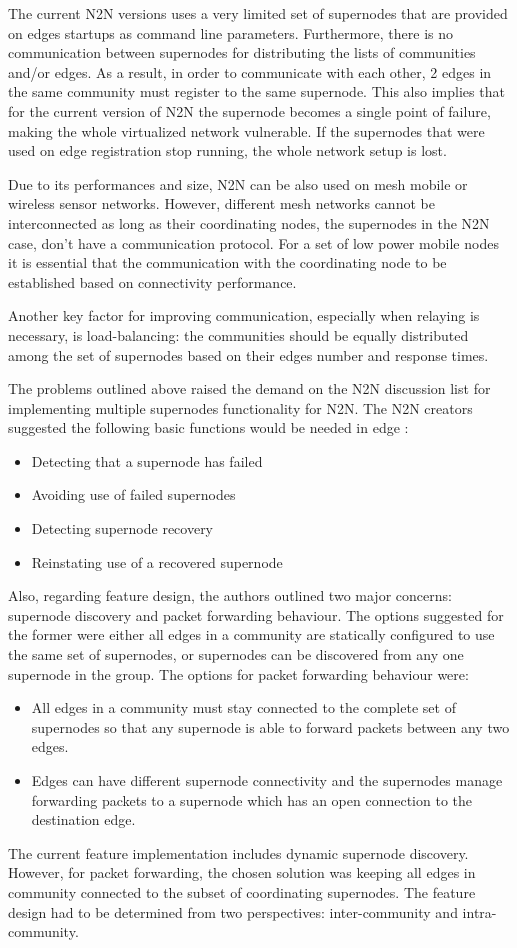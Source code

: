 
The current N2N versions uses a very limited set of supernodes that are provided on edges startups as command line parameters. Furthermore, there is no communication between supernodes for distributing the lists of communities and/or edges. As a result, in order to communicate with each other, 2 edges in the same community must register to the same supernode. This also implies that for the current version of N2N the supernode becomes a single point of failure, making the whole virtualized network vulnerable. If the supernodes that were used on edge registration stop running, the whole network setup is lost.

Due to its performances and size, N2N can be also used on mesh mobile or wireless sensor networks. However, different mesh networks cannot be interconnected as long as their coordinating nodes, the supernodes in the N2N case, don't have a communication protocol. For a set of low power mobile nodes it is essential that the communication with the coordinating node to be established based on connectivity performance.

Another key factor for improving communication, especially when relaying is necessary, is load-balancing: the communities should be equally distributed among the set of supernodes based on their edges number and response times.

The problems outlined above raised the demand on the N2N discussion list \cite{demand} for implementing multiple supernodes functionality for N2N. The N2N creators suggested the following basic functions would be needed in edge \cite{suggestions}:
\begin{itemize}
\item Detecting that a supernode has failed
\item Avoiding use of failed supernodes
\item Detecting supernode recovery
\item Reinstating use of a recovered supernode
\end{itemize}
Also, regarding feature design, the authors outlined two major concerns: supernode discovery and packet forwarding behaviour. The options suggested for the former were either all edges in a community are statically configured to use the same set of supernodes, or supernodes can be discovered from any one supernode in the group. The options for packet forwarding behaviour were:
\begin{itemize}
\item All edges in a community must stay connected to the complete set of supernodes so that any supernode is able to forward packets between any two edges.
\item Edges can have different supernode connectivity and the supernodes manage forwarding packets to a supernode which has an open connection to the destination edge.
\end{itemize}
The current feature implementation includes dynamic supernode discovery. However, for packet forwarding, the chosen solution was keeping all edges in community connected to the subset of coordinating supernodes. The feature design had to be determined from two perspectives: inter-community and intra-community.

